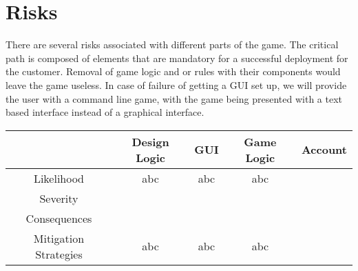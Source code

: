 \documentclass[11pt, titlepage]{article}
\begin{document}
    \section{Risks}

	    There are several risks associated with different parts of the game.
The critical path is composed of elements that are mandatory for a successful deployment for the customer. Removal of game logic and or rules with their components would leave the game useless.  In case of failure of getting a GUI set up, we will provide the user with a command line game, with the game being presented with a text based interface instead of a graphical interface.

			\begin{center}
				\begin{tabular}{| c | c | c | c | c |}
					\hline	 &\parbox{3cm}{Design Logic} & \parbox{3cm}{GUI} & \parbox{3cm}{Game Logic} & \parbox{3cm}{Account} \\
					\hline	Likelihood &	abc & abc & abc & \\
					\hline Severity & & && \\
					\hline Consequences & & && \\
					\hline Mitigation Strategies & abc & abc & abc &\\
					\hline
				\end{tabular}
			\end{center}
\end{document}
